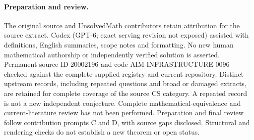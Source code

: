 \documentclass[11pt]{article}
\begin{document}
\paragraph{Preparation and review.}
The original source and UnsolvedMath contributors retain attribution for the source extract. Codex (GPT-6; exact serving revision not exposed) assisted with definitions, English summaries, scope notes and formatting. No new human mathematical authorship or independently verified solution is asserted. Permanent source ID 20002196 and code AIM-INFRASTRUCTURE-0096 checked against the complete supplied registry and current repository. Distinct upstream records, including repeated questions and broad or damaged extracts, are retained for complete coverage of the source CS category. A repeated record is not a new independent conjecture. Complete mathematical-equivalence and current-literature review has not been performed. Preparation and final review follow contribution prompts C and D, with source gaps disclosed. Structural and rendering checks do not establish a new theorem or open status.
\label{end:20002196}
\end{document}
